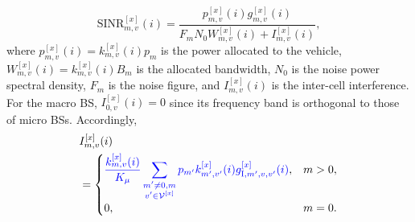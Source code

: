 \documentclass[conference, a4paper]{IEEEtran}
\newcommand{\rev}[1]{\textcolor{revisioncolor}{{}#1}}
\newif\ifshowdeletions
\newcommand{\currentdel}[1]{\ifshowdeletions\textcolor{deletioncolor}{\sout{#1}}\fi}
\theoremstyle{remark}
\begin{document}
\currentdel{Given allocated RBs, the instantaneous signal to interference plus noise ratio (SINR) of the desired-link from BS-$m$ to vehicle-$v$ is given by}
\begin{equation}
    \mathrm{SINR}_{m,v}^{[x]}(i) = \frac{p_{m,v}^{[x]}(i) g_{m,v}^{[x]}(i)}{F_{ m}N_0 W_{m,v}^{[x]}(i) + I_{m,v}^{[x]}(i) },
    \label{eq:SINR}
\end{equation}
where $p_{m,v}^{[x]}(i) = k_{m,v}^{[x]}(i) p_m$ is the power allocated to the vehicle, $W_{m,v}^{[x]}(i) = k_{m,v}^{[x]}(i) B_m$ is the allocated bandwidth, $N_0$ is the noise power spectral density, $F_{m}$ is the noise figure, and $I_{m,v}^{[x]}(i)$ is the inter-cell interference. For the macro BS, $I_{0,v}^{[x]}(i)=0$ since its frequency band is orthogonal to those of micro BSs. 
\currentdel{For each micro BS, since the OFDMA-based RB allocation across different BSs is assumed to be independent and uniformly random, the expected number of overlapping RBs between the set of RBs allocated by BS-$m$ to vehicle-$v$ and the set of RBs utilized by any interfering BS-$m'$ is $\frac{k_{m,v}^{[x]}(i) k_{m'}^{[x]}(i)}{K_\mu}$.}
Accordingly, \currentdel{the interference can be modeled as}
\begin{equation}
    \begin{aligned}
        & I_{m,v}^{[x]}(i) \\
        & =
        \begin{cases}
            \displaystyle
            \currentdel{\ensuremath{\sum\limits_{m'\neq 0,m} g_{{\rm I},m',v}^{[x]}(i) \frac{k_{m,v}^{[x]}(i) k_{m'}^{[x]}(i)}{K_\mu} p_{m'}}}\rev{\frac{k_{m,v}^{[x]}(i)}{K_\mu}
            \sum\limits_{\substack{m'\neq 0,m\\v'\in\mathcal V^{[x]}}}
            p_{m'}k_{m',v'}^{[x]}(i)g_{{\rm I},m',v,v'}^{[x]}(i)}, & m>0, \\
            \displaystyle
            0, & m=0.
        \end{cases}
    \end{aligned}
    \label{eq:interference}
\end{equation}
\end{document}
